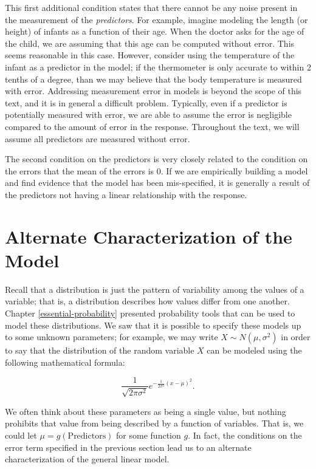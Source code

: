 \documentclass[
]{book}
\theoremstyle{plain}
\theoremstyle{mydefn}
\theoremstyle{myexmpl}
\theoremstyle{remark}
\begin{document}
This first additional condition states that there cannot be any noise present in the measurement of the \emph{predictors}. For example, imagine modeling the length (or height) of infants as a function of their age. When the doctor asks for the age of the child, we are assuming that this age can be computed without error. This seems reasonable in this case. However, consider using the temperature of the infant as a predictor in the model; if the thermometer is only accurate to within 2 tenths of a degree, than we may believe that the body temperature is measured with error. Addressing measurement error in models is beyond the scope of this text, and it is in general a difficult problem. Typically, even if a predictor is potentially measured with error, we are able to assume the error is negligible compared to the amount of error in the response. Throughout the text, we will assume all predictors are measured without error.

The second condition on the predictors is very closely related to the condition on the errors that the mean of the errors is 0. If we are empirically building a model and find evidence that the model has been mis-specified, it is generally a result of the predictors not having a linear relationship with the response.

\hypertarget{alternate-characterization-of-the-model}{%
\section{Alternate Characterization of the Model}\label{alternate-characterization-of-the-model}}

Recall that a distribution is just the pattern of variability among the values of a variable; that is, a distribution describes how values differ from one another. Chapter \ref{essential-probability} presented probability tools that can be used to model these distributions. We saw that it is possible to specify these models up to some unknown parameters; for example, we may write \(X \sim N\left(\mu, \sigma^2\right)\) in order to say that the distribution of the random variable \(X\) can be modeled using the following mathematical formula:

\[\frac{1}{\sqrt{2\pi\sigma^2}} e^{-\frac{1}{2\sigma^2}\left(x - \mu\right)^2}.\]

We often think about these parameters as being a single value, but nothing prohibits that value from being described by a function of variables. That is, we could let \(\mu = g(\text{Predictors})\) for some function \(g\). In fact, the conditions on the error term specified in the previous section lead us to an alternate characterization of the general linear model.
\end{document}
